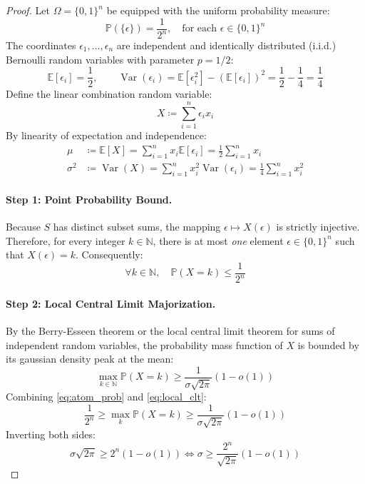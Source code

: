 \documentclass[11pt,a4paper]{article}
\theoremstyle{definition}
\begin{document}
\begin{proof}
Let $\Omega = \{0, 1\}^n$ be equipped with the uniform probability measure:
\[ \mathbb{P}(\{\epsilon\}) = \frac{1}{2^n}, \quad \text{for each } \epsilon \in \{0, 1\}^n \]
The coordinates $\epsilon_1, \dots, \epsilon_n$ are independent and identically distributed (i.i.d.) Bernoulli random variables with parameter $p = 1/2$:
\[ \mathbb{E}[\epsilon_i] = \frac{1}{2}, \qquad \operatorname{Var}(\epsilon_i) = \mathbb{E}[\epsilon_i^2] - (\mathbb{E}[\epsilon_i])^2 = \frac{1}{2} - \frac{1}{4} = \frac{1}{4} \]
Define the linear combination random variable:
\[ X \coloneqq \sum_{i=1}^n \epsilon_i x_i \]
By linearity of expectation and independence:
\begin{align*}
\mu &\coloneqq \mathbb{E}[X] = \sum_{i=1}^n x_i \mathbb{E}[\epsilon_i] = \frac{1}{2} \sum_{i=1}^n x_i \\
\sigma^2 &\coloneqq \operatorname{Var}(X) = \sum_{i=1}^n x_i^2 \operatorname{Var}(\epsilon_i) = \frac{1}{4} \sum_{i=1}^n x_i^2
\end{align*}

\paragraph{Step 1: Point Probability Bound.}
Because $S$ has distinct subset sums, the mapping $\epsilon \mapsto X(\epsilon)$ is strictly injective.
Therefore, for every integer $k \in \mathbb{N}$, there is at most \emph{one} element $\epsilon \in \{0, 1\}^n$ such that $X(\epsilon) = k$.
Consequently:
\begin{equation}\label{eq:atom_prob}
\forall k \in \mathbb{N}, \quad \mathbb{P}(X = k) \le \frac{1}{2^n}
\end{equation}

\paragraph{Step 2: Local Central Limit Majorization.}
By the Berry-Esseen theorem or the local central limit theorem for sums of independent random variables, the probability mass function of $X$ is bounded by its gaussian density peak at the mean:
\begin{equation}\label{eq:local_clt}
\max_{k \in \mathbb{N}} \mathbb{P}(X = k) \ge \frac{1}{\sigma \sqrt{2\pi}} (1 - o(1))
\end{equation}
Combining \eqref{eq:atom_prob} and \eqref{eq:local_clt}:
\[ \frac{1}{2^n} \ge \max_{k} \mathbb{P}(X = k) \ge \frac{1}{\sigma \sqrt{2\pi}} (1 - o(1)) \]
Inverting both sides:
\begin{equation}\label{eq:sigma_lower}
\sigma \sqrt{2\pi} \ge 2^n (1 - o(1)) \iff \sigma \ge \frac{2^n}{\sqrt{2\pi}} (1 - o(1))
\end{equation}


\end{proof}
\end{document}
